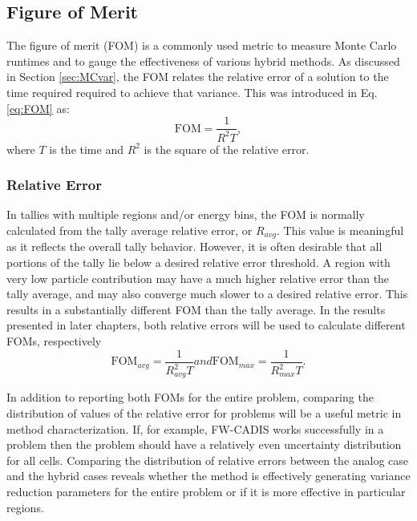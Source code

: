 \subsection{Figure of Merit}

The figure of merit (FOM) is a commonly used metric to measure Monte Carlo
runtimes and to gauge the effectiveness of various hybrid methods. As discussed
in Section \ref{sec:MCvar}, the FOM relates the relative error of a solution to the
time required required to achieve that variance. This was introduced in Eq.
\eqref{eq:FOM} as:
\begin{equation*}
  \text{FOM} = \frac{1}{R^{2}T} ,
\end{equation*}
where $T$ is the time and $R^{2}$ is the square of the relative error.

\subsubsection{Relative Error}

In tallies with multiple regions and/or energy bins, the FOM is normally calculated
from the tally average relative error, or $R_{avg}$. This value is meaningful as
it reflects the overall tally behavior. However, it is often desirable that all
portions of the tally lie below a desired relative error threshold. A region
with very low particle contribution may have a much higher relative error than
the tally average, and may also converge much slower to a desired relative
error. This results in a substantially different FOM than
the tally average. In the results presented in later chapters, both relative
errors will be used to calculate different FOMs, respectively
\begin{subequations}
  \begin{equation}
    \text{FOM}_{avg} = \frac{1}{R_{avg}^{2}T}
  \label{eq:FOMavg}
  \end{equation}
and
  \begin{equation}
    \text{FOM}_{max} = \frac{1}{R_{max}^{2}T} .
  \label{eq:FOMmax}
  \end{equation}
  \label{eq:FOMerror}
\end{subequations}

In addition to reporting both FOMs for the entire problem, comparing the
distribution of values of the relative error for problems will be a useful
metric in method characterization. If, for example, FW-CADIS works successfully
in a problem then the problem should have a relatively even uncertainty
distribution for all cells. Comparing the distribution of relative errors
between the analog case and the hybrid cases reveals whether the method is
effectively generating variance reduction parameters for the entire problem or
if it is more effective in particular regions.

